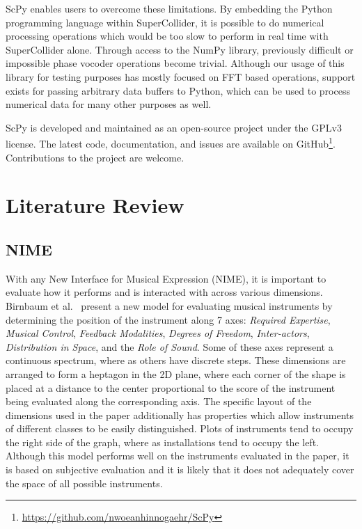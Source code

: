 \documentclass{article}
\begin{document}
ScPy enables users to overcome these limitations. By embedding the Python programming language
within SuperCollider, it is possible to do numerical processing operations which would be too slow
to perform in real time with SuperCollider alone. Through access to the NumPy library, previously
difficult or impossible phase vocoder operations become trivial. Although our usage of this library
for testing purposes has mostly focused on FFT based operations, support exists for passing
arbitrary data buffers to Python, which can be used to process numerical data for many other
purposes as well.

ScPy is developed and maintained as an open-source project under the GPLv3 license. The latest
code, documentation, and issues are available on
GitHub\footnote{\url{https://github.com/nwoeanhinnogaehr/ScPy}}. Contributions to the project are
welcome.

\section{Literature Review}\label{sec:lit}

\subsection{NIME}

With any New Interface for Musical Expression (NIME), it is important to evaluate how it performs
and is interacted with across various dimensions. Birnbaum et al.~\cite{birnbaum2005towards}
present a new model for evaluating musical instruments by determining the position of the
instrument along 7 axes: \textit{Required Expertise}, \textit{Musical Control}, \textit{Feedback
Modalities}, \textit{Degrees of Freedom}, \textit{Inter-actors}, \textit{Distribution in Space},
and the \textit{Role of Sound}. Some of these axes represent a continuous spectrum, where as others
have discrete steps. These dimensions are arranged to form a heptagon in the 2D plane, where each
corner of the shape is placed at a distance to the center proportional to the score of the
instrument being evaluated along the corresponding axis. The specific layout of the dimensions used
in the paper additionally has properties which allow instruments of different classes to be easily
distinguished. Plots of instruments tend to occupy the right side of the graph, where as
installations tend to occupy the left. Although this model performs well on the instruments
evaluated in the paper, it is based on subjective evaluation and it is likely that it does not
adequately cover the space of all possible instruments.
\end{document}

